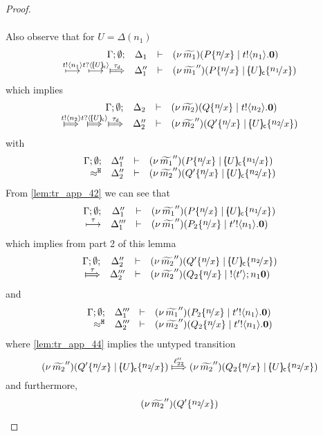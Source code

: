 \begin{proof}
\begin{enumerate}[1.]
\begin{itemize}
\begin{itemize}
\begin{eqnarray}
										\end{eqnarray}
										Also observe that for $U = \Delta(n_1)$
										\[
											\mhorel{\Gamma}{\Delta_1}{\newsp{\widetilde{m_1}}{P \subst{n}{x} \Par \bout{t}{n_1} \inact}}
											{ \hby{\bactout{t}{n_1}} \hby{\bactinp{t}{\omapchar{U}}} \Hby{\dtau} }
											{\Delta_1''}{}{\newsp{\widetilde{m_1}''}{P \subst{n}{x} \Par \omapchar{U} \subst{n_1}{x}}}
										\]
										which implies
										\[
											\mhorel{\Gamma}{\Delta_2}{\newsp{\widetilde{m_2}}{Q \subst{n}{x} \Par \bout{t}{n_2} \inact}}
											{ \Hby{\bactout{t}{n_2}} \Hby{\bactinp{t}{\omapchar{U}}} \Hby{\dtau} }
											{\Delta_2''}{}{\newsp{\widetilde{m_2}''}{Q' \subst{n}{x} \Par \omapchar{U} \subst{n_2}{x}}}
										\]
										with
										\[
											\mhorel{\Gamma}{\Delta_1''}{\newsp{\widetilde{m_1}''}{P \subst{n}{x} \Par \omapchar{U} \subst{n_1}{x}}}
											{\hwb}
											{\Delta_2''}{}{\newsp{\widetilde{m_2}''}{Q' \subst{n}{x} \Par \omapchar{U} \subst{n_2}{x}}}
										\]
										From \eqref{lem:tr_app_42} we can see that
										\[
											\mhorel{\Gamma}{\Delta_1''}{\newsp{\widetilde{m_1}''}{P \subst{n}{x} \Par \omapchar{U} \subst{n_1}{x}}}
											{ \hby{\tau} }
											{\Delta_1'''}{}{\newsp{\widetilde{m_1}''}{P_2 \subst{n}{x} \Par \bout{t'}{n_1} \inact}}
										\]
										which implies from part 2 of this lemma
										\begin{eqnarray}
											\mhorel{\Gamma}{\Delta_2''}{\newsp{\widetilde{m_2}''}{Q' \subst{n}{x} \Par \omapchar{U} \subst{n_2}{x}}}
											{\Hby{\tau}}
											{\Delta_2'''}{}{\newsp{\widetilde{m_2}''}{Q_2 \subst{n}{x} \Par \btout{t'}{n_1} \inact}}
											\label{lem:tr_app_44}
										\end{eqnarray}
										and
										\begin{eqnarray}
											\mhorel{\Gamma}{\Delta_1'''}{\newsp{\widetilde{m_1}''}{P_2 \subst{n}{x} \Par \bout{t'}{n_1} \inact}}
											{\hwb}
											{\Delta_2'''}{}{\newsp{\widetilde{m_2}''}{Q_2 \subst{n}{x} \Par \bout{t'}{n_1} \inact}}
											\label{lem:tr_app_45}
										\end{eqnarray}
										where \eqref{lem:tr_app_44} implies the untyped transition
										\[
											\newsp{\widetilde{m_2}''}{Q' \subst{n}{x} \Par \omapchar{U} \subst{n_2}{x}}
											\Hby{ \ell_{22}'' }
											\newsp{\widetilde{m_2}''}{Q_2 \subst{n}{x} \Par \omapchar{U} \subst{n_2}{x}}
										\]
										and furthermore,
										\[
											\newsp{\widetilde{m_2}''}{Q' \subst{n_2}{x}}
\]
\end{itemize}
\end{itemize}
\end{enumerate}
\end{proof}

